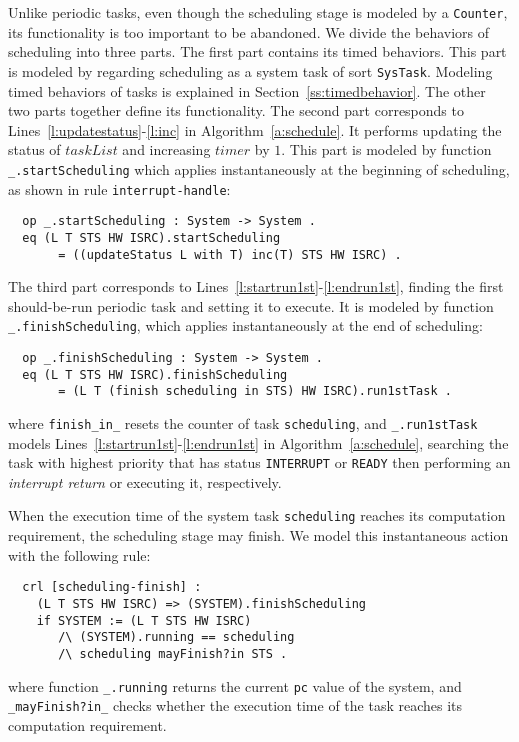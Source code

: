 \documentclass{llncs}
\newcommand{\hide}[1]{\ignorespaces}
\begin{document}
Unlike periodic tasks, even though the scheduling stage is modeled by
a \verb|Counter|, its functionality is too important to be abandoned.
We divide the behaviors of scheduling into three parts.  The first
part contains its timed behaviors. This part is modeled by regarding
scheduling as a system task of sort \verb|SysTask|. Modeling timed
behaviors of tasks is explained in Section~\ref{ss:timedbehavior}.
The other two parts together define its functionality. The second part
corresponds to Lines~\ref{l:updatestatus}-\ref{l:inc} in
Algorithm~\ref{a:schedule}. It performs updating the status of
$taskList$ and increasing $timer$ by $1$. This part is modeled by
function \verb|_.startScheduling| which applies instantaneously at the
beginning of scheduling, as shown in rule \verb|interrupt-handle|:
\begin{verbatim}
  op _.startScheduling : System -> System .
  eq (L T STS HW ISRC).startScheduling 
       = ((updateStatus L with T) inc(T) STS HW ISRC) .
\end{verbatim}
The third part corresponds to
Lines~\ref{l:startrun1st}-\ref{l:endrun1st}, finding the first
should-be-run periodic task and setting it to execute. It is modeled
by function \verb|_.finishScheduling|, which applies instantaneously
at the end of scheduling:
\begin{verbatim}
  op _.finishScheduling : System -> System .
  eq (L T STS HW ISRC).finishScheduling
       = (L T (finish scheduling in STS) HW ISRC).run1stTask .
\end{verbatim}
where \verb|finish_in_| resets the counter of task \verb|scheduling|,
and \verb|_.run1stTask| models
Lines~\ref{l:startrun1st}-\ref{l:endrun1st} in
Algorithm~\ref{a:schedule}, searching the task with highest priority
that has status \verb|INTERRUPT| or \verb|READY| then performing an
\emph{interrupt return} or executing it, respectively.

When the execution time of the system task \verb|scheduling| reaches
its computation requirement, the scheduling stage may finish. We model
this instantaneous action with the following rule:
\begin{verbatim}
  crl [scheduling-finish] :
    (L T STS HW ISRC) => (SYSTEM).finishScheduling
    if SYSTEM := (L T STS HW ISRC) 
       /\ (SYSTEM).running == scheduling 
       /\ scheduling mayFinish?in STS .
\end{verbatim}
where function \verb|_.running| returns the current \verb|pc| value of
the system, and \verb|_mayFinish?in_| checks whether the execution
time of the task reaches its computation requirement.
\hide{
\begin{verbatim}
  op _mayFinish?in_ : Oid SysTasks ~> Bool .
  eq O mayFinish?in [ < O : SysTask | cnt : C > REST ] 
       = C mayFinish? .
  op _mayFinish? : Counter -> Bool .
  eq [ R / [ MIN , MAX ] ] mayFinish?
       = if R lt MIN then false else true fi .
\end{verbatim}}
\end{document}
